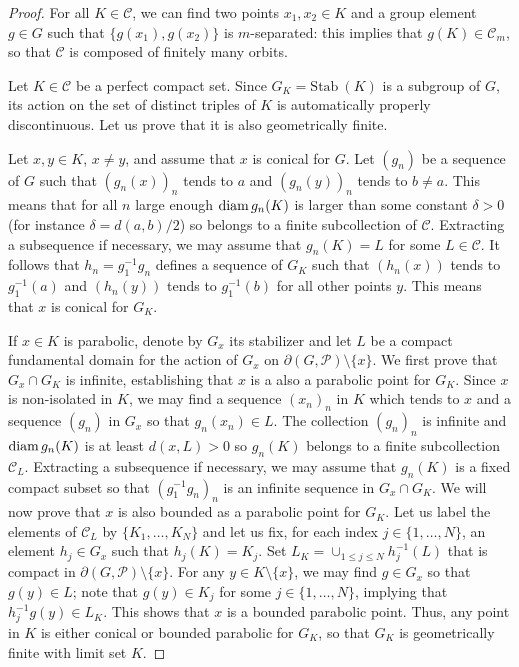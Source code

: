 \documentclass[11pt]{article}
\theoremstyle{definition}
\newcommand\CCC{\mathcal{C}}
\newcommand\PP{\mathcal{P}}
\newcommand\Stab{\text{Stab}}
\begin{document}
\begin{proof}
For all $K\in\CCC$, we can find two points 
$x_1,x_2\in K$ and a group element $g\in G$ such that $\{g(x_1),g(x_2)\}$ is $m$-separated: this implies
that $g(K)\in\CCC_m$, so that $\CCC$ is composed of finitely many orbits.

Let $K\in\CCC$ be a perfect compact set. Since $G_K=\Stab\ (K)$ is a subgroup of $G$, its action on the set of distinct triples of $K$ is automatically properly discontinuous.
Let us prove that it is also geometrically finite.  

Let $x,y\in K$, $x\neq y$, and assume that $x$ is conical for $G$. Let $(g_n)$ be a sequence of $G$ such that
$(g_n(x))_n$ tends to $a$ and $(g_n(y))_n$ tends to $b\ne a $.   This means that for all $n$ large enough $\hbox{diam}\,g_n(K)$ is larger than some constant $\delta>0$ (for instance $\delta=d(a,b)/2$)
so belongs to a finite subcollection of $\CCC$.   Extracting a subsequence if necessary, we may assume that $g_n(K)=L$ for some $L\in\CCC$. 
It follows that $h_n= g_1^{-1}g_n$  defines a sequence of $G_K$ such that $(h_n(x))$ tends to $g_1^{-1}(a)$ and $(h_n(y))$ tends to $g_1^{-1}(b)$ for all other
points $y$. This means that $x$ is conical for $G_K$.

 If $x\in K$ is parabolic, denote by $G_x$ its stabilizer and let $L$ be a compact fundamental domain for the action of $G_x$
on $\partial(G,\PP) \setminus\{x\}$. We first prove that $G_x\cap G_K$ is infinite, establishing that $x$ is a also a parabolic point for $G_K$. Since $x$ is non-isolated in $K$, we may find a sequence $(x_n)_n$ in $K$ which
tends to $x$ and a sequence  $(g_n)$ in $G_x$ so that $g_n(x_n)\in L$. The collection $(g_n)_n$ is infinite 
and  $\hbox{diam}\,g_n(K)$ is at least $d(x,L)>0$
so $g_n(K)$ belongs to a finite subcollection  $\CCC_L$. Extracting a subsequence if necessary, we may assume that $g_n(K)$ is a fixed  compact subset so that $(g_1^{-1}g_n)_n$ is an infinite
sequence in $G_x\cap G_K$. We will now prove that $x$ is also bounded as a parabolic point for $G_K$.  Let us label the elements of $\CCC_L$  by  $\{K_1,\ldots, K_N\}$ and let us  fix, for each index $j\in\{1,\ldots, N\}$,
an element $h_j\in G_x$ such that $h_j(K)=K_j$. Set $L_K= \cup_{1\le j\le N} h_j^{-1}(L)$ that is compact in $\partial(G,\PP) \setminus \{x\}$. 
For any $y\in K\setminus\{x\}$, we may find $g\in G_x$ so that $g(y)\in L$; note that $g(y)\in K_j$ for some $j\in\{1,\ldots, N\}$, implying that $h_j^{-1}g(y)\in L_K$. This shows that $x$
is a bounded parabolic point. Thus, any point in $K$ is either conical or bounded parabolic for $G_K$, so that $G_K$ is geometrically finite with limit set $K$.
\end{proof}
\end{document}
